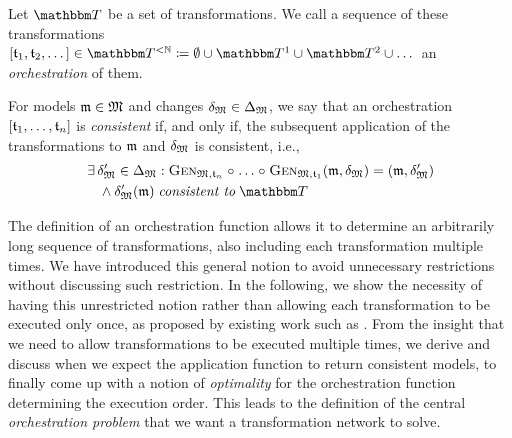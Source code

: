 \begin{definition}[Orchestration]
    Let $\transformationset{T}$ be a set of transformations.
    We call a sequence of these transformations $\sequenced{\transformation{t}_{1}, \transformation{t}_{2}, \dots} \in \transformationset{T}^{< \mathbb{N}} \equalsperdefinition \emptyset \cup \transformationset{T}^1 \cup \transformationset{T}^2 \cup \dots$ an \emph{orchestration} of them.

    For models $\mathfrak{m} \in \mathfrak{M}$ and changes $\mathfrak{\delta}_{\mathfrak{M}} \in \Delta_{\mathfrak{M}}$, we say that an orchestration $[\mathfrak{t}_{1}, \dots, \mathfrak{t}_{n}]$ is \emph{consistent} if, and only if, the subsequent application of the transformations to $\mathfrak{m}$ and $\mathfrak{\delta}_{\mathfrak{M}}$  is consistent, i.e., 
    \begin{align*}
        &
        \exists \changetuple{\metamodeltuple{M}}' \in \changeuniverse{\metamodeltuple{M}} : \generalizationfunction{\metamodeltuple{M},\transformation{t}_{n}} \concatfunction \dots \concatfunction \generalizationfunction{\metamodeltuple{M},\transformation{t}_{1}}(\modeltuple{m}, \changetuple{\metamodeltuple{M}}) = (\modeltuple{m}, \changetuple{\metamodeltuple{M}}') \\
        & \formulaskip
        \land \changetuple{\metamodeltuple{M}}'(\modeltuple{m}) \consistenttomath \transformationset{T}
    \end{align*}
\end{definition}

The definition of an orchestration function allows it to determine an arbitrarily long sequence of transformations, also including each transformation multiple times.
We have introduced this general notion to avoid unnecessary restrictions without discussing such restriction.
In the following, we show the necessity of having this unrestricted notion rather than allowing each transformation to be executed only once, as proposed by existing work such as \cite{stevens2020BidirectionalTransformationLarge-SoSym}.
From the insight that we need to allow transformations to be executed multiple times, we derive and discuss when we expect the application function to return consistent models, to finally come up with a notion of \emph{optimality} for the orchestration function determining the execution order.
This leads to the definition of the central \emph{orchestration problem} that we want a transformation network to solve.

